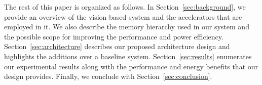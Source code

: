 The rest of this paper is organized as follows.
In Section~\ref{sec:background}, we provide an overview of the vision-based system and the accelerators that are employed in it. We also describe the memory hierarchy used in our system and the possible scope for improving the performance and power efficiency.
Section~\ref{sec:architecture} describes our proposed architecture design and highlights the additions over a baseline system.
Section~\ref{sec:results} enumerates our experimental results along with the performance and energy benefits that our design provides. Finally, we conclude with Section~\ref{sec:conclusion}.


